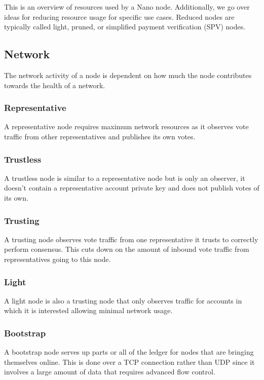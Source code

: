 This is an overview of resources used by a Nano node. Additionally, we go over ideas for reducing resource usage for specific use cases. Reduced nodes are typically called light, pruned, or simplified payment verification (SPV) nodes.

\subsection{Network}
The network activity of a node is dependent on how much the node contributes towards the health of a network.

\subsubsection{Representative}
A representative node requires maximum network resources as it observes vote traffic from other representatives and publishes its own votes.

\subsubsection{Trustless}
A trustless node is similar to a representative node but is only an observer, it doesn't contain a representative account private key and does not publish votes of its own.

\subsubsection{Trusting}
A trusting node observes vote traffic from one representative it trusts to correctly perform consensus. This cuts down on the amount of inbound vote traffic from representatives going to this node.

\subsubsection{Light}
A light node is also a trusting node that only observes traffic for accounts in which it is interested allowing minimal network usage.

\subsubsection{Bootstrap}
A bootstrap node serves up parts or all of the ledger for nodes that are bringing themselves online. This is done over a TCP connection rather than UDP since it involves a large amount of data that requires advanced flow control.

